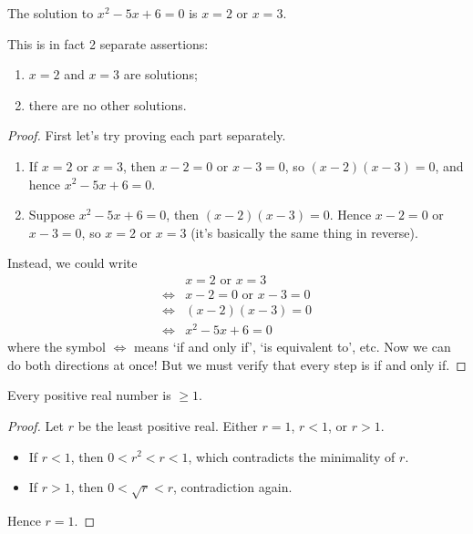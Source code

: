 \documentclass{../template/note}
\begin{document}
    \begin{claim}
        The solution to \(x^2 - 5x + 6 = 0\) is \(x = 2\) or \(x = 3\).
    \end{claim}

    \noindent This is in fact 2 separate assertions:

    \begin{enumerate}
        \item \(x = 2\) and \(x = 3\) are solutions;
        \item there are no other solutions.
    \end{enumerate}
    
    \begin{proof}
        First let's try proving each part separately.
        \begin{enumerate}
            \item If \(x=2\) or \(x=3\), then \(x-2=0\) or \(x-3=0\), so \((x-2)(x-3)=0\), and hence \(x^2-5x+6=0\).
            \item Suppose \(x^2-5x+6=0\), then \((x-2)(x-3)=0\). Hence \(x-2 = 0\) or \(x-3 = 0\), so \(x=2\) or \(x=3\) (it's basically the same thing in reverse).
        \end{enumerate}
        Instead, we could write
        \begin{align*}
            &x=2 \text{ or } x=3 \\
            \iff& x-2 = 0 \text{ or } x-3 = 0 \\
            \iff& (x-2)(x-3) = 0 \\
            \iff& x^2-5x+6 = 0
        \end{align*}
        where the symbol \(\iff\) means `if and only if', `is equivalent to', etc. Now we can do both directions at once! But we must verify that every step is if and only if.        
    \end{proof}

    \begin{claim}
        Every positive real number is \(\geq 1\).
    \end{claim}
    \begin{proof}
        Let \(r\) be the least positive real. Either \(r=1\), \(r<1\), or \(r>1\).
        \begin{itemize}
            \item If \(r<1\), then \(0 < r^2 < r < 1\), which contradicts the minimality of \(r\).
            \item If \(r>1\), then \(0 < \sqrt r < r\), contradiction again.
        \end{itemize}
        Hence \(r=1\).
    \end{proof}
    
\end{document}
